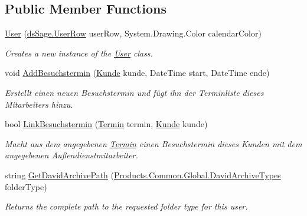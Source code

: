 \subsection*{Public Member Functions}
\begin{DoxyCompactItemize}
\item 
\hyperlink{class_products_1_1_model_1_1_entities_1_1_user_a75b87814221ff4d3c15f6ceac6ed5c94}{User} (\hyperlink{class_products_1_1_data_1_1ds_sage_1_1_user_row}{ds\+Sage.\+User\+Row} user\+Row, System.\+Drawing.\+Color calendar\+Color)
\begin{DoxyCompactList}\small\item\em Creates a new instance of the \hyperlink{class_products_1_1_model_1_1_entities_1_1_user}{User} class. \end{DoxyCompactList}\item 
void \hyperlink{class_products_1_1_model_1_1_entities_1_1_user_a401e29ce24c022ed5da34c0ae6ec9ece}{Add\+Besuchstermin} (\hyperlink{class_products_1_1_model_1_1_entities_1_1_kunde}{Kunde} kunde, Date\+Time start, Date\+Time ende)
\begin{DoxyCompactList}\small\item\em Erstellt einen neuen Besuchstermin und fügt ihn der Terminliste dieses Mitarbeiters hinzu. \end{DoxyCompactList}\item 
bool \hyperlink{class_products_1_1_model_1_1_entities_1_1_user_af0d43f92e520fe79e3f919f63a95df10}{Link\+Besuchstermin} (\hyperlink{class_products_1_1_model_1_1_entities_1_1_termin}{Termin} termin, \hyperlink{class_products_1_1_model_1_1_entities_1_1_kunde}{Kunde} kunde)
\begin{DoxyCompactList}\small\item\em Macht aus dem angegebenen \hyperlink{class_products_1_1_model_1_1_entities_1_1_termin}{Termin} einen Besuchstermin dieses Kunden mit dem angegebenen Außendienstmitarbeiter. \end{DoxyCompactList}\item 
string \hyperlink{class_products_1_1_model_1_1_entities_1_1_user_a0cce79c83f7189c50bb3ee0d257ef874}{Get\+David\+Archive\+Path} (\hyperlink{class_products_1_1_common_1_1_global_a7ede04d6b09286853ace66419c751b9c}{Products.\+Common.\+Global.\+David\+Archive\+Types} folder\+Type)
\begin{DoxyCompactList}\small\item\em Returns the complete path to the requested folder type for this user. \end{DoxyCompactList}\end{DoxyCompactItemize}
